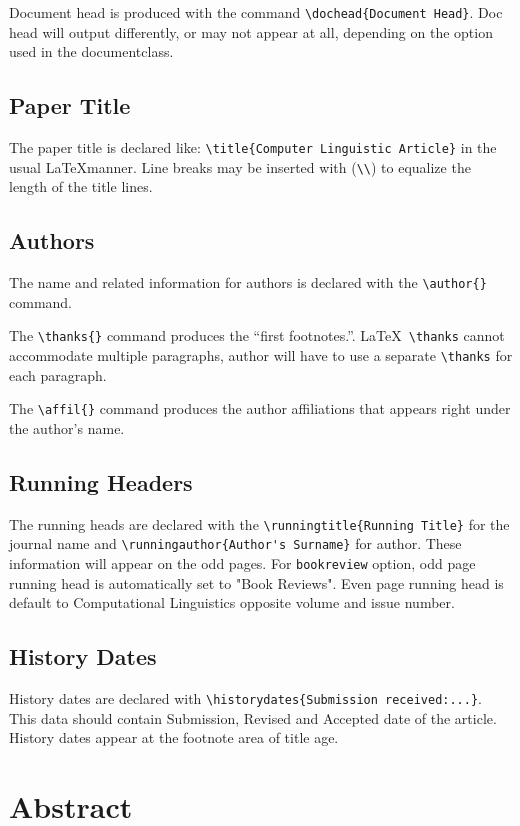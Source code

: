 \documentclass{clv3}
\begin{document}
Document head is produced with the command \verb|\dochead{Document Head}|. Doc head
will output differently, or may not appear at all, depending on the option used in the
documentclass.

\subsection{Paper Title}

The paper title is declared like: \verb|\title{Computer Linguistic Article}|
in the usual \LaTeX manner. Line breaks may be inserted with (\verb|\\|) to equalize
the length of the title lines.

\subsection{Authors}
The name and related information for authors is declared with the \verb|\author{}| command.

The \verb|\thanks{}| command produces the ``first footnotes.''. \LaTeX\ \verb|\thanks|
cannot accommodate multiple paragraphs, author will have to use a separate \verb|\thanks|
for each paragraph.

The \verb|\affil{}| command produces the author affiliations that appears right under
the author's name.

\subsection{Running Headers}
The running heads are declared with the \verb|\runningtitle{Running Title}| for the
journal name and \verb|\runningauthor{Author's Surname}| for author. These information
will appear on the odd pages. For {\tt bookreview} option, odd page running head is
automatically set to "Book Reviews". Even page running head is default to Computational
Linguistics opposite volume and issue number.

\subsection{History Dates}

History dates are declared with \verb|\historydates{Submission received:...}|. This data
should contain Submission, Revised and Accepted date of the article. History dates appear
at the footnote area of title age.


\section{Abstract}
\end{document}
